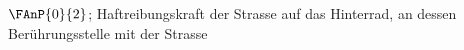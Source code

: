 $\FAnP{0}{2}$; Haftreibungskraft der Strasse auf das Hinterrad, an dessen Berührungsstelle mit der Strasse
